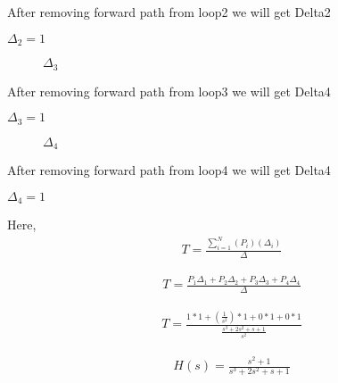 \begin{enumerate}[label=\thesection.\arabic*.,ref=\thesection.\theenumi]
After removing forward path from loop2 we will get Delta2

$\Delta_2 = 1$

\begin{figure}[!ht]
\begin{center}
		
		\resizebox{\columnwidth}{!}{}
	\end{center}
\caption{$\Delta_3$}
\label{fig:sec_order}
\end{figure}

After removing forward path from loop3 we will get Delta4

$\Delta_3 = 1$

\begin{figure}[!ht]
\begin{center}
		
		\resizebox{\columnwidth}{!}{}
	\end{center}
\caption{$\Delta_4$}
\label{fig:sec_order}
\end{figure}

After removing forward path from loop4 we will get Delta4

$\Delta_4 = 1$

Here, 
\begin{align}
T=\frac{\sum_{i=1}^{N}(P_i)(\Delta_i)}{\Delta}
\end{align}

\begin{align}
T=\frac{P_1 \Delta_1+P_2 \Delta_2+P_3 \Delta_3+P_4 \Delta_4}{\Delta}
\end{align}

\begin{align}
T=\frac{1*1 +(\frac{1}{s^2})*1 + 0*1 + 0*1 }{\frac{s^3+2s^2+s+1}{s^2}}
\end{align}

\begin{align}
H(s)=\frac{s^2+1}{s^3+2s^2+s+1}
\end{align}
\renewcommand{\thefigure}{\theenumi}

\end{enumerate}